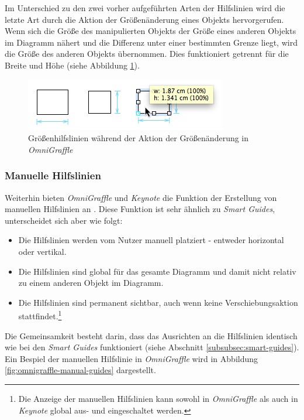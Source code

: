 Im Unterschied zu den zwei vorher aufgeführten Arten der Hilfslinien wird die letzte Art durch die Aktion der Größenänderung eines Objekts hervorgerufen. Wenn sich die Größe des manipulierten Objekts der Größe eines anderen Objekts im Diagramm nähert und die Differenz unter einer bestimmten Grenze liegt, wird die Größe des anderen Objekts übernommen. Dies funktioniert getrennt für die Breite und Höhe (siehe Abbildung \ref{fig:omnigraffle-sizing-guides}).

\begin{figure}[hbt]
    \centering
    \includegraphics{assets/omnigraffle-sizing-guides.png}
    \caption{Größenhilfslinien während der Aktion der Größenänderung in \textit{OmniGraffle}}
    \label{fig:omnigraffle-sizing-guides}
\end{figure}

\subsubsection{Manuelle Hilfslinien}

Weiterhin bieten \textit{OmniGraffle} und \textit{Keynote} die Funktion der Erstellung von manuellen Hilfslinien an \cite{08OmniGraffle, 11Keynote}. Diese Funktion ist sehr ähnlich zu \textit{Smart Guides}, unterscheidet sich aber wie folgt:

\begin{itemize}
    \item Die Hilfslinien werden vom Nutzer manuell platziert - entweder horizontal oder vertikal.
    \item Die Hilfslinien sind global für das gesamte Diagramm und damit nicht relativ zu einem anderen Objekt im Diagramm.
    \item Die Hilfslinien sind permanent sichtbar, auch wenn keine Verschiebungsaktion stattfindet.\footnote{Die Anzeige der manuellen Hilfslinien kann sowohl in \textit{OmniGraffle} als auch in \textit{Keynote} global aus- und eingeschaltet werden.}
\end{itemize}

Die Gemeinsamkeit besteht darin, dass das Ausrichten an die Hilfslinien identisch wie bei den \textit{Smart Guides} funktioniert (siehe Abschnitt \ref{subsubsec:smart-guides}). Ein Bespiel der manuellen Hilfslinie in \textit{OmniGraffle} wird in Abbildung \ref{fig:omnigraffle-manual-guides} dargestellt.

